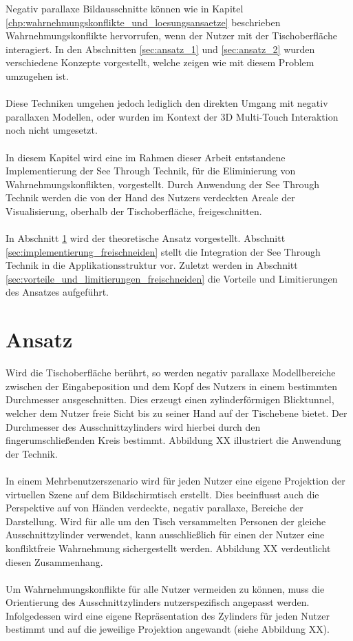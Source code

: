 Negativ parallaxe Bildausschnitte können wie in Kapitel \ref{chp:wahrnehmungskonflikte_und_loesungsansaetze} beschrieben Wahrnehmungskonflikte hervorrufen, wenn der Nutzer mit der Tischoberfläche interagiert. In den Abschnitten \ref{sec:ansatz_1} und \ref{sec:ansatz_2} wurden verschiedene Konzepte vorgestellt, welche zeigen wie mit diesem Problem umzugehen ist. 
\\\\
Diese Techniken umgehen jedoch lediglich den direkten Umgang mit negativ parallaxen Modellen, oder wurden im Kontext der 3D Multi-Touch Interaktion noch nicht umgesetzt. 
\\\\
In diesem  Kapitel wird eine im Rahmen dieser Arbeit entstandene Implementierung der See Through Technik, für die Eliminierung von Wahrnehmungskonflikten, vorgestellt. Durch Anwendung der See Through Technik werden die von der Hand des Nutzers verdeckten Areale der Visualisierung, oberhalb der Tischoberfläche, freigeschnitten.
\\\\
In Abschnitt \ref{sec:ansatz} wird der theoretische Ansatz vorgestellt. Abschnitt \ref{sec:implementierung_freischneiden} stellt die Integration der See Through Technik in die Applikationsstruktur vor. Zuletzt werden in Abschnitt \ref{sec:vorteile_und_limitierungen_freischneiden} die Vorteile und Limitierungen des Ansatzes aufgeführt.


\section{Ansatz}
\label{sec:ansatz}

Wird die Tischoberfläche berührt, so werden negativ parallaxe Modellbereiche zwischen der Eingabeposition und dem Kopf des Nutzers in einem bestimmten Durchmesser ausgeschnitten. Dies erzeugt einen zylinderförmigen Blicktunnel, welcher dem Nutzer freie Sicht bis zu seiner Hand auf der Tischebene bietet. Der Durchmesser des Ausschnittzylinders wird hierbei durch den fingerumschließenden Kreis bestimmt. Abbildung XX illustriert die Anwendung der Technik.
\\\\
In einem Mehrbenutzerszenario wird für jeden Nutzer eine eigene Projektion der virtuellen Szene auf dem Bildschirmtisch erstellt. Dies beeinflusst auch die Perspektive auf von Händen verdeckte, negativ parallaxe, Bereiche der Darstellung. Wird für alle um den Tisch versammelten Personen der gleiche Ausschnittzylinder verwendet, kann ausschließlich für einen der Nutzer eine konfliktfreie Wahrnehmung sichergestellt werden. Abbildung XX verdeutlicht diesen Zusammenhang.
\\\\
Um Wahrnehmungskonflikte für alle Nutzer vermeiden zu können, muss die Orientierung des Ausschnittzylinders nutzerspezifisch angepasst werden. Infolgedessen wird eine eigene Repräsentation des Zylinders für jeden Nutzer bestimmt und auf die jeweilige Projektion angewandt (siehe Abbildung XX).



